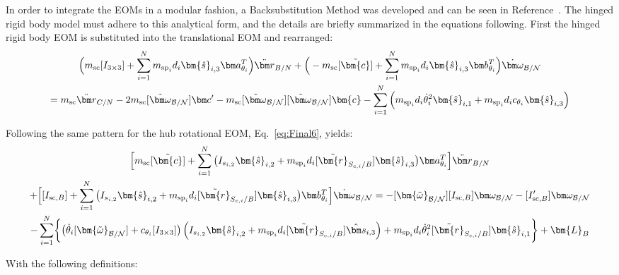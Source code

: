 In order to integrate the EOMs in a modular fashion, a Backsubstitution Method was developed and can be seen in Reference~\cite{Allard2016rz}. The hinged rigid body model must adhere to this analytical form, and the details are briefly summarized in the equations following. First the hinged rigid body EOM is substituted into the translational EOM and rearranged:
\begin{multline}
\Big(m_{\text{sc}} [I_{3\times3}] +\sum_{i=1}^{N}m_{\text{sp}_i}d_i \bm{\hat{s}}_{i,3} \bm a_{\theta_i}^T\Big)\ddot{\bm r}_{B/N}+\Big(-m_{\text{sc}} [\tilde{\bm{c}}] +\sum_{i=1}^{N}m_{\text{sp}_i}d_i \bm{\hat{s}}_{i,3} \bm b_{\theta_i}^T\Big) \dot{\bm\omega}_{\cal B/N} \\
= m_{\text{sc}} \ddot{\bm r}_{C/N} 	- 2 m_{\text{sc}} [\tilde{\bm\omega}_{\cal B/N}] \bm c'
-m_{\text{sc}} [\tilde{\bm\omega}_{\cal B/N}][\tilde{\bm\omega}_{\cal B/N}]\bm{c}
-\sum_{i=1}^{N}\Big(m_{\text{sp}_i}d_i \dot{\theta}_i^2 \bm{\hat{s}}_{i,1}+m_{\text{sp}_i}d_i c_{\theta_i} \bm{\hat{s}}_{i,3} \Big)
\label{eq:Rbddot8}
\end{multline}

Following the same pattern for the hub rotational EOM, Eq.~\eqref{eq:Final6}, yields:
\begin{multline}
\Big[m_{\text{sc}}[\tilde{\bm{c}}] +\sum\limits_{i=1}^{N}\big( I_{s_{i,2}}\bm{\hat{s}}_{i,2}+m_{\text{sp}_i}d_i [\tilde{\bm{r}}_{S_{c,i}/B}] \bm{\hat{s}}_{i,3}\big)\bm a_{\theta_i}^T \Big]\ddot{\bm r}_{B/N}\\
+\Big[[I_{\text{sc},B}]+\sum\limits_{i=1}^{N}\big( I_{s_{i,2}}\bm{\hat{s}}_{i,2}+m_{\text{sp}_i}d_i [\tilde{\bm{r}}_{S_{c,i}/B}] \bm{\hat{s}}_{i,3}\big) \bm b_{\theta_i}^T\Big] \dot{\bm\omega}_{\cal B/N}
=
-[\bm{\tilde{\omega}}_{\cal B/N}] [I_{\text{sc},B}] \bm\omega_{\cal B/N}
- [I'_{\text{sc},B}] \bm\omega_{\cal B/N} \\
-\sum\limits_{i=1}^{N}\biggl\lbrace\big(\dot{\theta}_i [\bm{\tilde{\omega}}_{\cal B/N}] +c_{\theta_i} [I_{3\times3}]\big) \left(I_{s_{i,2}} \bm{\hat{s}}_{i,2}+m_{\text{sp}_i} d_i [\tilde{\bm{r}}_{S_{c,i}/B}] \hat{\bm s}_{i,3}\right) +m_{\text{sp}_i}d_i\dot{\theta}_i^2[\tilde{\bm{r}}_{S_{c,i}/B}] \bm{\hat{s}}_{i,1} \biggr\rbrace + \bm{L}_B
\label{eq:Final9}
\end{multline}

With the following definitions:

